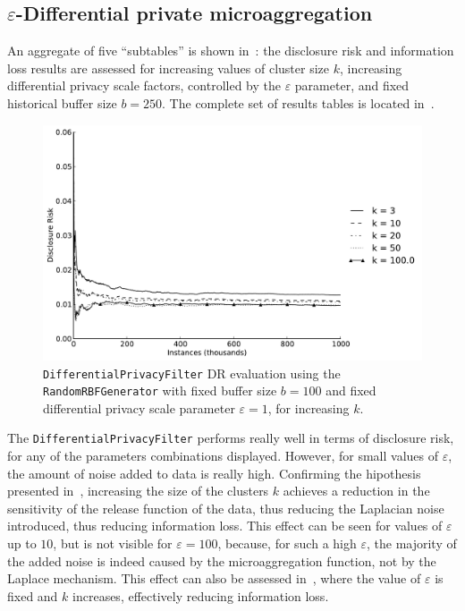 \clearpage

\subsection{$\varepsilon$-Differential private microaggregation}
\label{Benchmarking:Results:DiffPriv}

An aggregate of five ``subtables'' is shown in~: the disclosure risk and information loss results are assessed for increasing values of cluster size $k$, increasing differential privacy scale factors, controlled by the $\varepsilon$ parameter, and fixed historical buffer size $b = 250$. The complete set of results tables is located in~.

\begin{figure}[h]
	\centering
	\includegraphics[width=0.9\linewidth]{figures/dr_dp-e1-random.pdf}
	\caption[Differential privacy DR evaluation ($b = 100,~\varepsilon = 1$).]{\texttt{DifferentialPrivacyFilter} DR evaluation using the \texttt{RandomRBFGenerator} with fixed buffer size $b = 100$ and fixed differential privacy scale parameter $\varepsilon = 1$, for increasing $k$.}
	\label{fig:results-dr-dp-e1}
\end{figure}

The \texttt{DifferentialPrivacyFilter} performs really well in terms of disclosure risk, for any of the parameters combinations displayed. However, for small values of $\varepsilon$, the amount of noise added to data is really high. Confirming the hipothesis presented in~, increasing the size of the clusters $k$ achieves a reduction in the sensitivity of the release function of the data, thus reducing the Laplacian noise introduced, thus reducing information loss. This effect can be seen for values of $\varepsilon$ up to $10$, but is not visible for $\varepsilon = 100$, because, for such a high $\varepsilon$, the majority of the added noise is indeed caused by the microaggregation function, not by the Laplace mechanism. This effect can also be assessed in~, where the value of $\varepsilon$ is fixed and $k$ increases, effectively reducing information loss.

